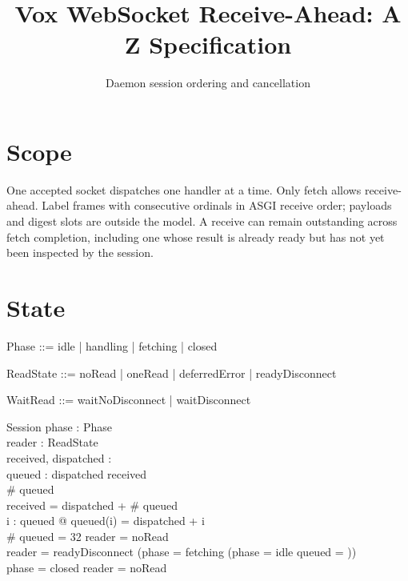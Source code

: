 \documentclass[a4paper,10pt,fleqn]{article}
\begin{document}
\title{Vox WebSocket Receive-Ahead: A Z Specification}
\author{Daemon session ordering and cancellation}
\maketitle

\section{Scope}

One accepted socket dispatches one handler at a time. Only fetch allows
receive-ahead. Label frames with consecutive ordinals in ASGI receive
order; payloads and digest slots are outside the model. A receive can
remain outstanding across fetch completion, including one whose result
is already ready but has not yet been inspected by the session.

\section{State}

\begin{zed}
  Phase ::= idle | handling | fetching | closed
\end{zed}

\begin{zed}
  ReadState ::= noRead | oneRead | deferredError | readyDisconnect
\end{zed}

\begin{zed}
  WaitRead ::= waitNoDisconnect | waitDisconnect
\end{zed}

\begin{schema}{Session}
  phase : Phase \\
  reader : ReadState \\
  received, dispatched : \nat \\
  queued : \seq \nat
  \where
  dispatched \leq received \\
  \# queued  \\
  received = dispatched + \# queued \\
  \forall i : \dom queued @ queued(i) = dispatched + i \\
  \# queued = 32 \implies reader = noRead \\
  reader = readyDisconnect \implies
    (phase = fetching \lor (phase = idle \land queued = \langle \rangle)) \\
  phase = closed \implies reader = noRead
\end{schema}
\end{document}
